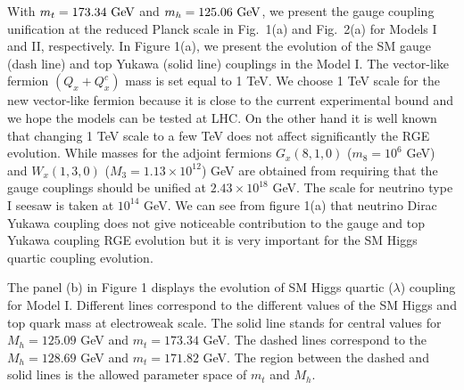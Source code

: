 \documentclass[aps,prd,preprint,superscriptaddress,showpacs,ctexart]{revtex4-1}
\begin{document}
With $m_{t}=173.34{\rm ~GeV}$ and $m_{h}=125.06{\rm ~GeV}$, we present
the gauge coupling unification at the reduced Planck scale in Fig.~1(a)
and Fig.~2(a) for Models I and II, respectively. In Figure 1(a),
we present the evolution of the SM gauge (dash line) and top Yukawa
(solid line) couplings in the Model I. The vector-like
fermion $(Q_{x}+Q_{x}^{c})$ mass is set equal to 1 TeV. We choose
1 TeV scale for the new vector-like fermion because it is close to the
current experimental bound and we hope the models can be tested at
LHC. On the other hand it is well known that changing 1
TeV scale to a few TeV does not affect significantly the RGE evolution. 
While masses for the
adjoint fermions $G_{x}(8,1,0)$ ($m_{8}=10^{6}$ GeV) and $W_{x}(1,3,0)$
($M_{3}=1.13\times10^{12}$) GeV are obtained from requiring that
the gauge couplings should be unified at $2.43\times10^{18}$ GeV.
The scale for neutrino type I seesaw is taken at $10^{14}$ GeV. We
can see from figure 1(a) that neutrino Dirac Yukawa coupling does not give
noticeable contribution to the gauge and top Yukawa coupling RGE evolution but it is very important for the SM Higgs quartic coupling evolution.

The panel (b) in Figure 1 displays the evolution of SM Higgs
quartic ($\lambda$) coupling for Model I. Different lines correspond
to the different values of the SM Higgs and top quark mass at electroweak
scale. The solid line stands for central values for $M_{h}=125.09$
GeV and $m_{t}=173.34$ GeV. The dashed lines correspond to the $M_{h}=128.69$
GeV and $m_{t}=171.82$ GeV. The region between the dashed and solid
lines is the allowed parameter space of $m_{t}$ and $M_{h}$.
\end{document}
